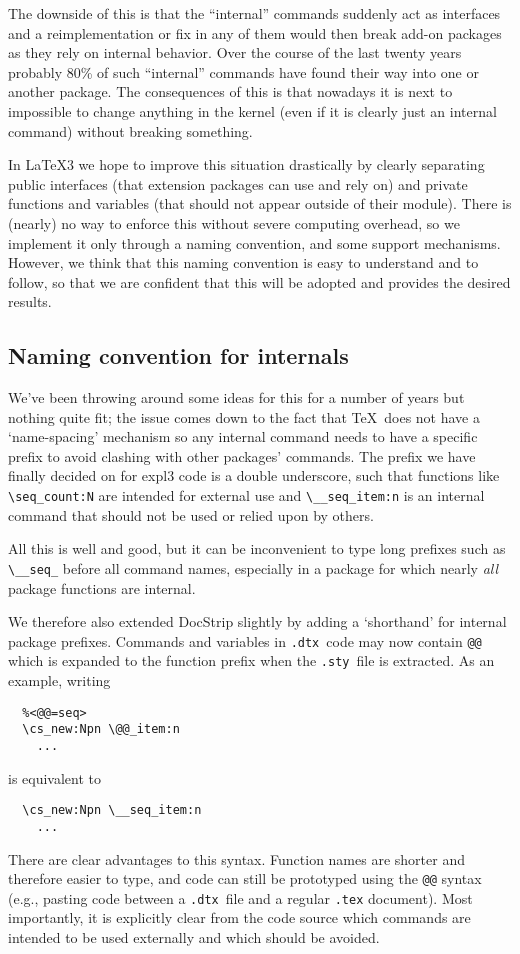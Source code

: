\documentclass{ltnews}
\def\DTX{\texttt{.dtx}}
\def\STY{\texttt{.sty}}
\begin{document}
The downside of this is that the ``internal'' commands suddenly act as
interfaces and a reimplementation or fix in any of them would then
break add-on packages as they rely on internal behavior. Over the
course of the last twenty years probably 80\% of such ``internal''
commands have found their way into one or another package.  The
consequences of this is that nowadays it is next to impossible to
change anything in the \LaTeXe{} kernel (even if it is clearly just an
internal command) without breaking something.


In \LaTeX3 we hope to improve this situation drastically by
clearly separating public interfaces (that extension packages can use
and rely on) and private functions and variables (that should not
appear outside of their module).  There is (nearly) no way to enforce
this without severe computing overhead, so we implement it only
through a naming convention, and some support mechanisms.  However, we
think that this naming convention is easy to understand and to follow,
so that we are confident that this will be adopted and provides the
desired results.

\subsection{Naming convention for internals}

We've been throwing around some ideas for this for a number of years but nothing quite fit; the issue comes down to the fact that \TeX\ does not have a `name-spacing' mechanism so any internal command needs to have a specific prefix to avoid clashing with other packages' commands.
The prefix we have finally decided on for \textsf{expl3} code is a double underscore, such that functions like \verb|\seq_count:N| are intended for external use and \verb|\__seq_item:n| is an internal command that should not be used or relied upon by others.

All this is well and good, but it can be inconvenient to type long prefixes such as \verb|\__seq_| before all command names, especially in a package for which nearly \emph{all} package functions are internal.

We therefore also extended \textsf{DocStrip} slightly by adding  a `shorthand' for internal package prefixes.
Commands and variables in \DTX\ code may now contain \texttt{@@} which is expanded to the function prefix when the \STY\ file is extracted.
As an example, writing
\begin{verbatim}
  %<@@=seq>
  \cs_new:Npn \@@_item:n
    ...
\end{verbatim}
is equivalent to
\begin{verbatim}
  \cs_new:Npn \__seq_item:n
    ...
\end{verbatim}
There are clear advantages to this syntax.
Function names are shorter and therefore easier to type, and code can still be prototyped using the \texttt{@@} syntax
(e.g., pasting code between a \DTX\ file and a regular \texttt{.tex} document).
Most importantly, it is explicitly clear from the code source which commands are intended to be used externally and which should be avoided.
\end{document}

